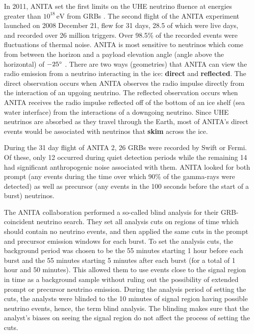 \documentclass[12pt]{article}
\begin{document}
\begin{doublespace}
In 2011, ANITA set the first limits on the UHE neutrino fluence at energies greater than $10^{18} \, \mathrm{eV}$ from GRBs \cite{anita}. The second flight of the ANITA experiment launched on 2008 December 21, flew for 31 days, 28.5 of which were live days, and recorded over 26 million triggers. Over 98.5\% of the recorded events were fluctuations of thermal noise. ANITA is most sensitive to neutrinos which come from between the horizon and a payload elevation angle (angle above the horizontal) of $-25\degree$ \cite{anita}. There are two ways (geometries) that ANITA can view the radio emission from a neutrino interacting in the ice: \textbf{direct} and \textbf{reflected}. The direct observation occurs when ANITA observes the radio impulse directly from the interaction of an upgoing neutrino. The reflected observation occurs when ANITA receives the radio impulse reflected off of the bottom of an ice shelf (sea water interface) from the interactions of a downgoing neutrino. Since UHE neutrinos are absorbed as they travel through the Earth, most of ANITA's direct events would be associated with neutrinos that \textbf{skim} across the ice. \par
During the 31 day flight of ANITA 2, 26 GRBs were recorded by Swift or Fermi. Of these, only 12 occurred during quiet detection periods while the remaining 14 had significant anthropogenic noise associated with them. ANITA looked for both prompt (any events during the time over which 90\% of the gamma-rays were detected) as well as precursor (any events in the 100 seconds before the start of a burst) neutrinos.\par
The ANITA collaboration performed a so-called blind analysis for their GRB-coincident neutrino search. They set all analysis cuts on regions of time which should contain no neutrino events, and then applied the same cuts in the prompt and precursor emission windows for each burst. To set the analysis cuts, the background period was chosen to be the 55 minutes starting 1 hour before each burst and the 55 minutes starting 5 minutes after each burst (for a total of 1 hour and 50 minutes). This allowed them to use events close to the signal region in time as a background sample without ruling out the possibility of extended prompt or precursor neutrino emission. During the analysis period of setting the cuts, the analysts were blinded to the 10 minutes of signal region having possible neutrino events, hence, the term blind analysis. The blinding makes sure that the analyst's biases on seeing the signal region do not affect the process of setting the cuts.\par

\end{doublespace}
\end{document}
